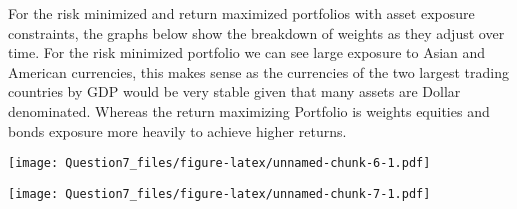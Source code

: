 \documentclass[
]{article}
\begin{document}
For the risk minimized and return maximized portfolios with asset
exposure constraints, the graphs below show the breakdown of weights as
they adjust over time. For the risk minimized portfolio we can see large
exposure to Asian and American currencies, this makes sense as the
currencies of the two largest trading countries by GDP would be very
stable given that many assets are Dollar denominated. Whereas the return
maximizing Portfolio is weights equities and bonds exposure more heavily
to achieve higher returns.

\texttt{[image: Question7\_files/figure-latex/unnamed-chunk-6-1.pdf]}

\texttt{[image: Question7\_files/figure-latex/unnamed-chunk-7-1.pdf]}
\end{document}
